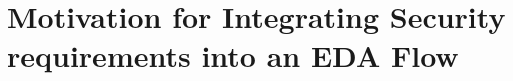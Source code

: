 \section{Motivation for Integrating Security requirements into an EDA Flow}
\label{sec:motivation}


